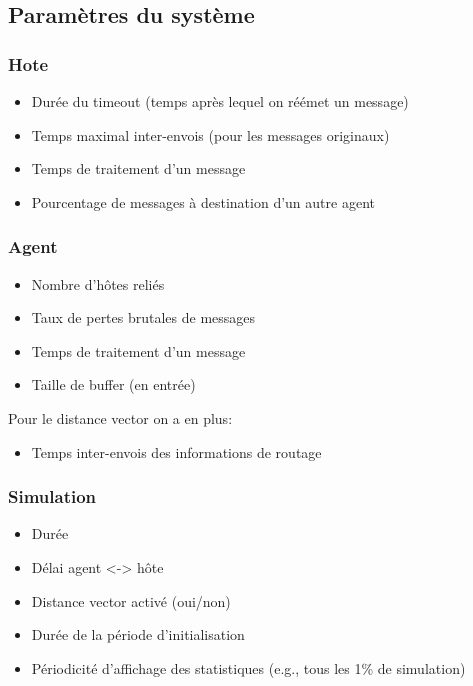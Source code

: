 \documentclass[a4paper,11pt]{article}
\begin{document}
\subsection{Paramètres du système}

\subsubsection{Hote}
\begin{itemize}
 \item Durée du timeout (temps après lequel on réémet un message)
 \item Temps maximal inter-envois (pour les messages originaux)
 \item Temps de traitement d'un message
 \item Pourcentage de messages à destination d'un autre agent
\end{itemize}


\subsubsection{Agent}

\begin{itemize}
 \item Nombre d'hôtes reliés
 \item Taux de pertes brutales de messages
 \item Temps de traitement d'un message
 \item Taille de buffer (en entrée)
\end{itemize}

Pour le distance vector on a en plus:
\begin{itemize}
 \item Temps inter-envois des informations de routage
\end{itemize}

\subsubsection{Simulation}
\begin{itemize}
 \item Durée
 \item Délai agent <-> hôte
 \item Distance vector activé (oui/non)
 \item Durée de la période d'initialisation
 \item Périodicité d'affichage des statistiques (e.g., tous les 1\% de simulation)
\end{itemize}
\end{document}
